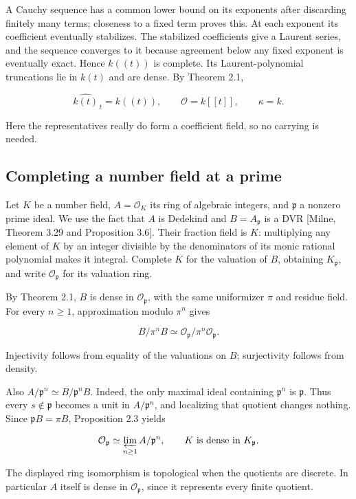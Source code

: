 \documentclass[
  english,
  11pt,
  a4paper,
]{article}
\begin{document}
A Cauchy sequence has a common lower bound on its exponents after
discarding finitely many terms; closeness to a fixed term proves this.
At each exponent its coefficient eventually stabilizes. The stabilized
coefficients give a Laurent series, and the sequence converges to it
because agreement below any fixed exponent is eventually exact. Hence
\(k((t))\) is complete. Its Laurent-polynomial truncations lie in
\(k(t)\) and are dense. By Theorem 2.1,

\[\widehat{k(t)}_{\,t}=k((t)),\qquad \mathcal O=k[[t]],\qquad\kappa=k.\]

Here the representatives really do form a coefficient field, so no
carrying is needed.

\subsection{Completing a number field at a
prime}\label{NT-LOC-02--completing-a-number-field-at-a-prime}

Let \(K\) be a number field, \(A=\mathcal O_K\) its ring of algebraic
integers, and \(\mathfrak p\) a nonzero prime ideal. We use the fact
that \(A\) is Dedekind and \(B=A_{\mathfrak p}\) is a DVR {[}Milne,
Theorem 3.29 and Proposition 3.6{]}. Their fraction field is \(K\):
multiplying any element of \(K\) by an integer divisible by the
denominators of its monic rational polynomial makes it integral.
Complete \(K\) for the valuation of \(B\), obtaining
\(K_{\mathfrak p}\), and write \(\mathcal O_{\mathfrak p}\) for its
valuation ring.

By Theorem 2.1, \(B\) is dense in \(\mathcal O_{\mathfrak p}\), with the
same uniformizer \(\pi\) and residue field. For every \(n\ge1\),
approximation modulo \(\pi^n\) gives

\[B/\pi^nB\simeq
\mathcal O_{\mathfrak p}/\pi^n\mathcal O_{\mathfrak p}.\]

Injectivity follows from equality of the valuations on \(B\);
surjectivity follows from density.

Also \(A/\mathfrak p^n\simeq B/\mathfrak p^nB\). Indeed, the only
maximal ideal containing \(\mathfrak p^n\) is \(\mathfrak p\). Thus
every \(s\notin\mathfrak p\) becomes a unit in \(A/\mathfrak p^n\), and
localizing that quotient changes nothing. Since \(\mathfrak pB=\pi B\),
Proposition 2.3 yields

\[\mathcal O_{\mathfrak p}\simeq
\varprojlim_{n\ge1}A/\mathfrak p^n,
\qquad
K\text{ is dense in }K_{\mathfrak p}.\]

The displayed ring isomorphism is topological when the quotients are
discrete. In particular \(A\) itself is dense in
\(\mathcal O_{\mathfrak p}\), since it represents every finite quotient.
\end{document}
